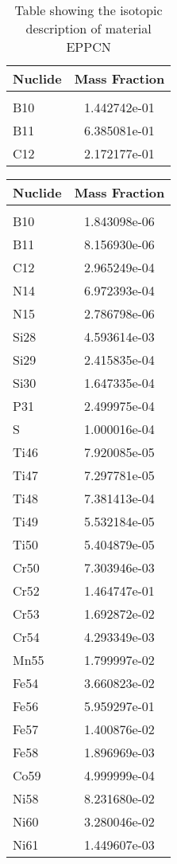 \begin{centering}
\begin{table}[ht!]
\begin{tabular}{l | c}
\hline
Nuclide & Mass Fraction\\
\hline
\\
B10 & 1.442742e-01\\
B11 & 6.385081e-01\\
C12 & 2.172177e-01
\end{tabular}
\caption{Table showing the isotopic description of material EPPCN}
\label{table:material_EPPCN}
\end{table}\clearpage

\begin{table}[ht!]
\begin{tabular}{l | c}
\hline
Nuclide & Mass Fraction\\
\hline
\\
B10 & 1.843098e-06\\
B11 & 8.156930e-06\\
C12 & 2.965249e-04\\
N14 & 6.972393e-04\\
N15 & 2.786798e-06\\
Si28 & 4.593614e-03\\
Si29 & 2.415835e-04\\
Si30 & 1.647335e-04\\
P31 & 2.499975e-04\\
S & 1.000016e-04\\
Ti46 & 7.920085e-05\\
Ti47 & 7.297781e-05\\
Ti48 & 7.381413e-04\\
Ti49 & 5.532184e-05\\
Ti50 & 5.404879e-05\\
Cr50 & 7.303946e-03\\
Cr52 & 1.464747e-01\\
Cr53 & 1.692872e-02\\
Cr54 & 4.293349e-03\\
Mn55 & 1.799997e-02\\
Fe54 & 3.660823e-02\\
Fe56 & 5.959297e-01\\
Fe57 & 1.400876e-02\\
Fe58 & 1.896969e-03\\
Co59 & 4.999999e-04\\
Ni58 & 8.231680e-02\\
Ni60 & 3.280046e-02\\
Ni61 & 1.449607e-03\\

\end{tabular}
\end{table}
\end{centering}
